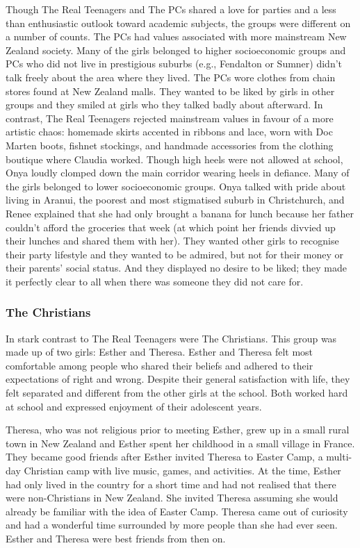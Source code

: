 Though The Real Teenagers and The PCs shared a love for parties and a less than enthusiastic outlook toward academic subjects, the groups were different on a number of counts. The PCs had values associated with more mainstream New Zealand society. Many of the girls belonged to higher socioeconomic groups and PCs who did not live in prestigious suburbs (e.g., Fendalton or Sumner) didn't talk freely about the area where they lived. The PCs wore clothes from chain stores found at New Zealand malls. They wanted to be liked by girls in other groups and they smiled at girls who they talked badly about afterward. In contrast, The Real Teenagers rejected mainstream values in favour of a more artistic chaos: homemade skirts accented in ribbons and lace, worn with Doc Marten boots, fishnet stockings, and handmade accessories from the clothing boutique where Claudia worked. Though high heels were not allowed at school, Onya loudly clomped down the main corridor wearing heels in defiance. Many of the girls belonged to lower socioeconomic groups. Onya talked with pride about living in Aranui, the poorest and most stigmatised suburb in Christchurch, and Renee explained that she had only brought a banana for lunch because her father couldn't afford the groceries that week (at which point her friends divvied up their lunches and shared them with her). They wanted other girls to recognise their party lifestyle and they wanted to be admired, but not for their money or their parents' social status. And they displayed no desire to be liked; they made it perfectly clear to all when there was someone they did not care for.

\subsubsection{The Christians}

In stark contrast to The Real Teenagers were The Christians. This group was made up of two girls: Esther and Theresa. Esther and Theresa felt most comfortable among people who shared their beliefs and adhered to their expectations of right and wrong. Despite their general satisfaction with life, they felt separated and different from the other girls at the school. Both worked hard at school and expressed enjoyment of their adolescent years.
 
Theresa, who was not religious prior to meeting Esther, grew up in a small rural town in New Zealand and Esther spent her childhood in a small village in France. They became good friends after Esther invited Theresa to Easter Camp, a multi-day Christian camp with live music, games, and activities. At the time, Esther had only lived in the country for a short time and had not realised that there were non-Christians in New Zealand. She invited Theresa assuming she would already be familiar with the idea of Easter Camp. Theresa came out of curiosity and had a wonderful time surrounded by more people than she had ever seen. Esther and Theresa were best friends from then on. 

